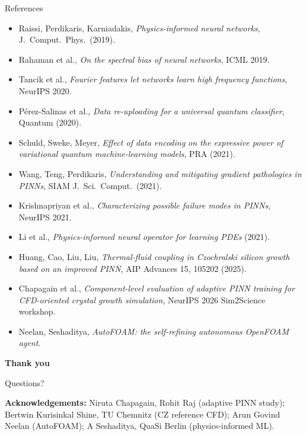 \documentclass[aspectratio=169,10pt]{beamer}
\begin{document}
\begin{frame}{References}
\scriptsize
\begin{itemize}\setlength{\itemsep}{1pt}
  \item Raissi, Perdikaris, Karniadakis, \emph{Physics-informed neural networks}, J.\ Comput.\ Phys.\ (2019).
  \item Rahaman et al., \emph{On the spectral bias of neural networks}, ICML 2019.
  \item Tancik et al., \emph{Fourier features let networks learn high frequency functions}, NeurIPS 2020.
  \item P\'erez-Salinas et al., \emph{Data re-uploading for a universal quantum classifier}, Quantum (2020).
  \item Schuld, Sweke, Meyer, \emph{Effect of data encoding on the expressive power of variational quantum machine-learning models}, PRA (2021).
  \item Wang, Teng, Perdikaris, \emph{Understanding and mitigating gradient pathologies in PINNs}, SIAM J.\ Sci.\ Comput.\ (2021).
  \item Krishnapriyan et al., \emph{Characterizing possible failure modes in PINNs}, NeurIPS 2021.
  \item Li et al., \emph{Physics-informed neural operator for learning PDEs} (2021).
  \item Huang, Cao, Liu, Liu, \emph{Thermal-fluid coupling in Czochralski silicon growth based on an improved PINN}, AIP Advances 15, 105202 (2025).
  \item Chapagain et al., \emph{Component-level evaluation of adaptive PINN training for CFD-oriented crystal growth simulation}, NeurIPS 2026 Sim2Science workshop.
  \item Neelan, Seshaditya, \emph{AutoFOAM: the self-refining autonomous OpenFOAM agent}.
\end{itemize}
\end{frame}

\begin{frame}
\centering
\Large\textbf{Thank you}

\vspace{0.3cm}
\normalsize Questions?

\vspace{0.6cm}
\footnotesize
\textbf{Acknowledgements:} Niruta Chapagain, Rohit Raj (adaptive PINN study);
Bertwin Kurisinkal Shine, TU Chemnitz (CZ reference CFD);
Arun Govind Neelan (AutoFOAM); A Seshaditya, QuaSi Berlin (physics-informed ML).
\end{frame}
\end{document}
